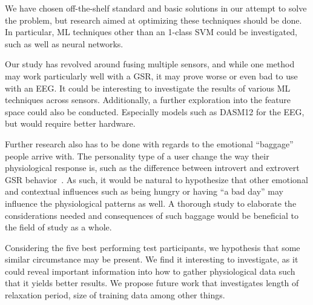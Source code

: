 We have chosen off-the-shelf standard and basic solutions in our attempt to solve the problem, but research aimed at optimizing these techniques should be done. 
In particular, ML techniques other than an 1-class SVM could be investigated, such as well as neural networks.

Our study has revolved around fusing multiple sensors, and while one method may work particularly well with a GSR, it may prove worse or even bad to use with an EEG. 
It could be interesting to investigate the results of various ML techniques across sensors.
Additionally, a further exploration into the feature space could also be conducted. 
Especially models such as DASM12\cite{eeg_music_listening} for the EEG, but would require better hardware.

Further research also has to be done with regards to the emotional ``baggage'' people arrive with. 
The personality type of a user change the way their physiological response is, such as the difference between introvert and extrovert GSR behavior~\cite{Foglia20081814}.
As such, it would be natural to hypothesize that other emotional and contextual influences such as being hungry or having ``a bad day'' may influence the physiological patterns as well. 
A thorough study to elaborate the considerations needed and consequences of such baggage would be beneficial to the field of study as a whole. 

Considering the five best performing test participants, we hypothesis that some similar circumstance may be present. We
find it interesting to investigate, as it could reveal important information into how to gather physiological data such
that it yields better results. We propose future work that investigates length of relaxation period, size of training
data among other things.
